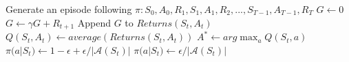 \begin{enumerate}
\begin{algorithm}[H]
\begin{algorithmic}[1]
		\State Generate an episode following \begin{math} \pi: S_0, A_0, R_1, S_1, A_1, R_2, ..., S_{T-1}, A_{T-1}, R_T\end{math}
		\State \begin{math} G \leftarrow 0 \end{math}
			\State \begin{math}G \leftarrow \gamma G + R_{t+1} \end{math}
				\State Append \begin{math} G \end{math} to \begin{math}Returns(S_t, A_t)\end{math}
				\State \begin{math}Q(S_t, A_t) \leftarrow average(Returns(S_t, A_t))\end{math}
				\State \begin{math}A^* \leftarrow arg\max_{a}Q(S_t, a) \end{math}
			\EndIf
						\State \begin{math} \pi(a|S_t) \leftarrow 1-\epsilon+\epsilon/|\mathcal{A}(S_t)| \end{math}
					\Else
						\State \begin{math} \pi(a|S_t) \leftarrow \epsilon/|\mathcal{A}(S_t)| \end{math}
					\EndIf
				\EndFor
		\EndFor
	\end{algorithmic}
	\end{algorithm}
\end{enumerate}

